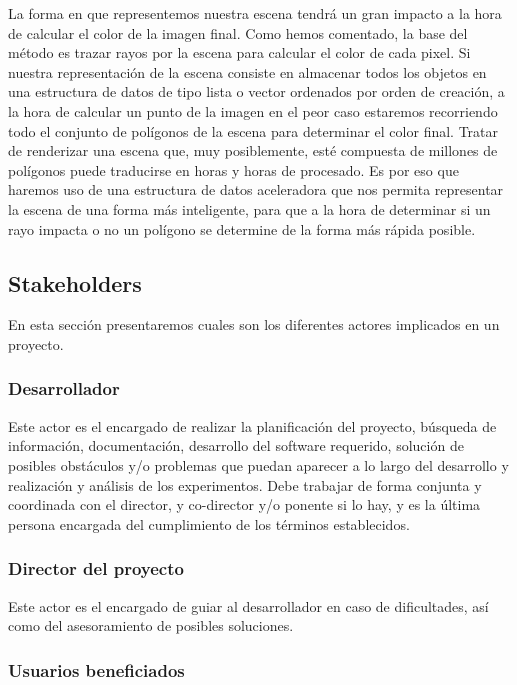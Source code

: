 \documentclass[titlepage,12pt]{report}
\begin{document}
La forma en que representemos nuestra escena tendrá un gran impacto a la hora de calcular el color de la imagen final. Como hemos comentado, la base del método es trazar rayos por la escena para calcular el color de cada pixel. Si nuestra representación de la escena consiste en almacenar todos los objetos en una estructura de datos de tipo lista o vector ordenados por orden de creación, a la hora de calcular un punto de la imagen en el peor caso estaremos recorriendo todo el conjunto de polígonos de la escena para determinar el color final. Tratar de renderizar una escena que, muy posiblemente, esté compuesta de millones de polígonos puede traducirse en horas y horas de procesado. Es por eso que haremos uso de una estructura de datos aceleradora que nos permita representar la escena de una forma más inteligente, para que a la hora de determinar si un rayo impacta o no un polígono se determine de la forma más rápida posible.

\subsection{Stakeholders}

En esta sección presentaremos cuales son los diferentes actores implicados en un proyecto.

\subsubsection{Desarrollador}

Este actor es el encargado de realizar la planificación del proyecto, búsqueda de información, documentación, desarrollo del software requerido, solución de posibles obstáculos y/o problemas que puedan aparecer a lo largo del desarrollo y realización y análisis de los experimentos. Debe trabajar de forma conjunta y coordinada con el director, y co-director y/o ponente si lo hay, y es la última persona encargada del cumplimiento de los términos establecidos.

\subsubsection{Director del proyecto}

Este actor es el encargado de guiar al desarrollador en caso de dificultades, así como del asesoramiento de posibles soluciones.

\subsubsection{Usuarios beneficiados}
\end{document}
